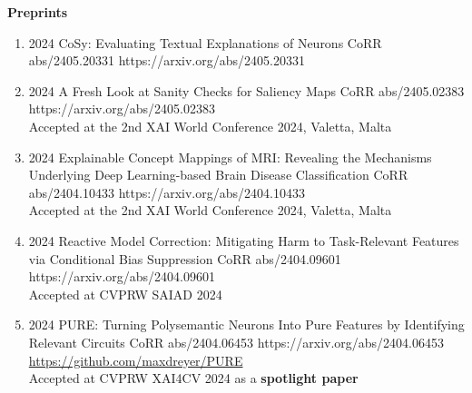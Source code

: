 \headedsection %
{\bf Preprints}{}
{
    \begin{enumerate}

        \item {}
                        {2024}
                        {CoSy: Evaluating Textual Explanations of Neurons}
                        {CoRR abs/2405.20331}
                        {https://arxiv.org/abs/2405.20331}

        \item {}
                        {2024}
                        {A Fresh Look at Sanity Checks for Saliency Maps}
                        {CoRR abs/2405.02383}
                        {https://arxiv.org/abs/2405.02383}
                        {\\ Accepted at the 2nd XAI World Conference 2024, Valetta, Malta}

        \item {}
                        {2024}
                        {Explainable Concept Mappings of MRI: Revealing the Mechanisms Underlying Deep Learning-based Brain Disease Classification}
                        {CoRR abs/2404.10433}
                        {https://arxiv.org/abs/2404.10433}
                        {\\ Accepted at the 2nd XAI World Conference 2024, Valetta, Malta}


        \item {}
                        {2024}
                        {Reactive Model Correction: Mitigating Harm to Task-Relevant Features via Conditional Bias Suppression}
                        {CoRR abs/2404.09601}
                        {https://arxiv.org/abs/2404.09601}
                        {\\ Accepted at CVPRW SAIAD 2024}

        \item {}
                        {2024}
                        {PURE: Turning Polysemantic Neurons Into Pure Features by Identifying Relevant Circuits}
                        {CoRR abs/2404.06453}
                        {https://arxiv.org/abs/2404.06453}
                        {\\\href{https://github.com/maxdreyer/PURE}{https://github.com/maxdreyer/PURE}\\
                        Accepted at CVPRW XAI4CV 2024 as a \textbf{spotlight paper}}


\end{enumerate}}
